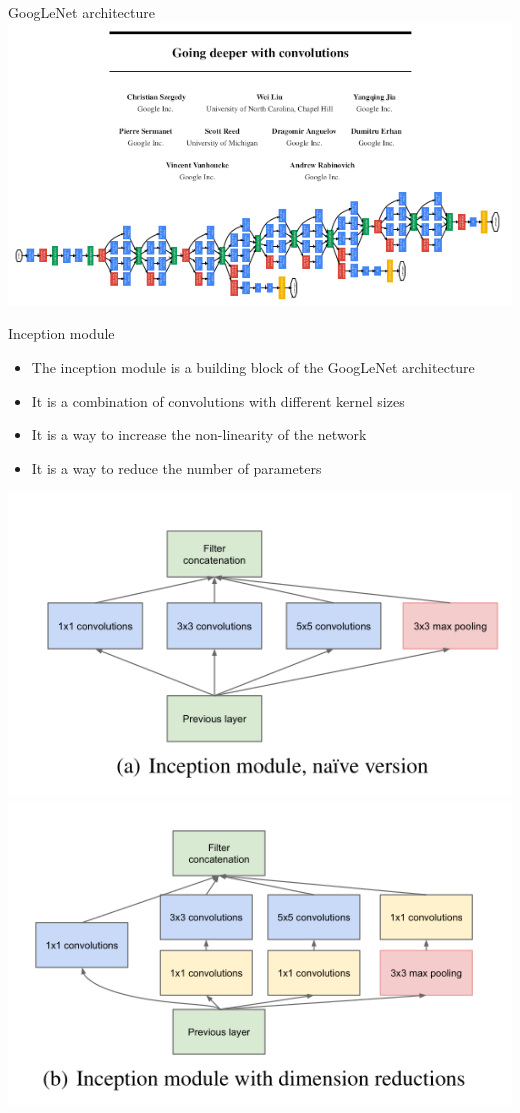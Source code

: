 \documentclass[9pt, aspectratio=169]{beamer}
\begin{document}
\begin{frame}
    {GoogLeNet architecture}
    \centering
    \includegraphics[width=\textwidth]{GoogLeNet.png}
\end{frame}

\begin{frame}
    {Inception module}
    \begin{itemize}
        \item The inception module is a building block of the GoogLeNet architecture
        \item It is a combination of convolutions with different kernel sizes
        \item It is a way to increase the non-linearity of the network
        \item It is a way to reduce the number of parameters
    \end{itemize}

    \centering
    \includegraphics[width=.4\textwidth]{inception_naive.png}
    \pause
    \includegraphics[width=.4\textwidth]{inception_dimred.png}

\end{frame}
\end{document}
